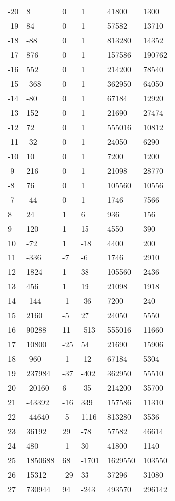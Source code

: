 \documentclass{amsart}
\begin{document}
\begin{longtable}{llllll}
-20 & 8 & 0 & 1 & 41800 & 1300\\
-19 & 84 & 0 & 1 & 57582 & 13710\\
-18 & -88 & 0 & 1 & 813280 & 14352\\
-17 & 876 & 0 & 1 & 157586 & 190762\\
-16 & 552 & 0 & 1 & 214200 & 78540\\
-15 & -368 & 0 & 1 & 362950 & 64050\\
-14 & -80 & 0 & 1 & 67184 & 12920\\
-13 & 152 & 0 & 1 & 21690 & 27474\\
-12 & 72 & 0 & 1 & 555016 & 10812\\
-11 & -32 & 0 & 1 & 24050 & 6290\\
-10 & 10 & 0 & 1 & 7200 & 1200\\
-9 & 216 & 0 & 1 & 21098 & 28770\\
-8 & 76 & 0 & 1 & 105560 & 10556\\
-7 & -44 & 0 & 1 & 1746 & 7566\\
8 & 24 & 1 & 6 & 936 & 156\\
9 & 120 & 1 & 15 & 4550 & 390\\
10 & -72 & 1 & -18 & 4400 & 200\\
11 & -336 & -7 & -6 & 1746 & 2910\\
12 & 1824 & 1 & 38 & 105560 & 2436\\
13 & 456 & 1 & 19 & 21098 & 1918\\
14 & -144 & -1 & -36 & 7200 & 240\\
15 & 2160 & -5 & 27 & 24050 & 5550\\
16 & 90288 & 11 & -513 & 555016 & 11660\\
17 & 10800 & -25 & 54 & 21690 & 15906\\
18 & -960 & -1 & -12 & 67184 & 5304\\
19 & 237984 & -37 & -402 & 362950 & 55510\\
20 & -20160 & 6 & -35 & 214200 & 35700\\
21 & -43392 & -16 & 339 & 157586 & 11310\\
22 & -44640 & -5 & 1116 & 813280 & 3536\\
23 & 36192 & 29 & -78 & 57582 & 46614\\
24 & 480 & -1 & 30 & 41800 & 1140\\
25 & 1850688 & 68 & -1701 & 1629550 & 103550\\
26 & 15312 & -29 & 33 & 37296 & 31080\\
27 & 730944 & 94 & -243 & 493570 & 296142\\

\end{longtable}
\end{document}
